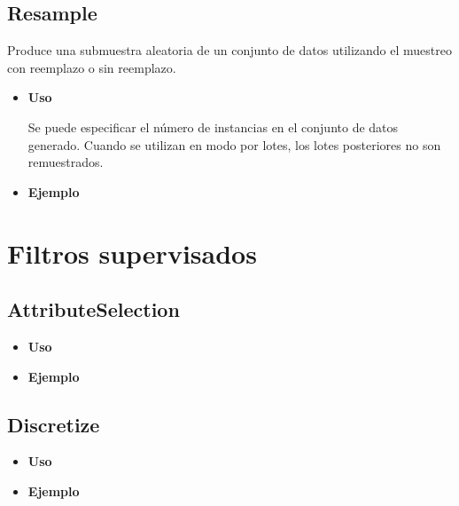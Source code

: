 	\subsection{Resample}
	\begin{justify}
	Produce una submuestra aleatoria de un conjunto de datos utilizando el muestreo con reemplazo o sin reemplazo. 
	\end{justify}
	\begin{itemize}
		\item \textbf{Uso}
	\begin{justify}
	Se puede especificar el número de instancias en el conjunto de datos generado. Cuando se utilizan en modo por lotes, los lotes posteriores no son remuestrados.
	\end{justify}
		\item \textbf{Ejemplo}
	\end{itemize}

\newpage
\section{Filtros supervisados}
	\subsection{AttributeSelection}
	\begin{justify}

	\end{justify}
	\begin{itemize}
		\item \textbf{Uso}
	\begin{justify}

	\end{justify}
		\item \textbf{Ejemplo}
	\end{itemize}
	
	\subsection{Discretize}
	\begin{justify}

	\end{justify}
	\begin{itemize}
		\item \textbf{Uso} 
	\begin{justify}

	\end{justify}
		\item \textbf{Ejemplo}
	\end{itemize}
 	

